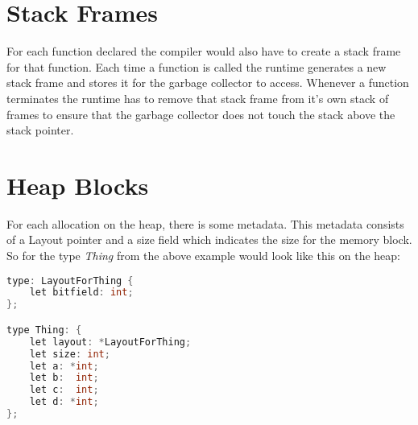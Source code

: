 \section*{Stack Frames}

For each function declared the compiler would also have to create a stack frame for that function. Each time a function is called the runtime generates a new stack frame and stores it for the garbage collector to access. Whenever a function terminates the runtime has to remove that stack frame from it's own stack of frames to ensure that the garbage collector does not touch the stack above the stack pointer.

\section*{Heap Blocks}
For each allocation on the heap, there is some metadata. This metadata consists of a Layout pointer and a size field which indicates the size for the memory block. So for the type \textit{Thing} from the above example would look like this on the heap:

\begin{lstlisting}[language=C,morekeywords={Thing, LayoutForThing}]
type: LayoutForThing {
    let bitfield: int;
};

type Thing: {
    let layout: *LayoutForThing;
    let size: int;
    let a: *int;
    let b:  int;
    let c:  int;
    let d: *int;
};
\end{lstlisting}
